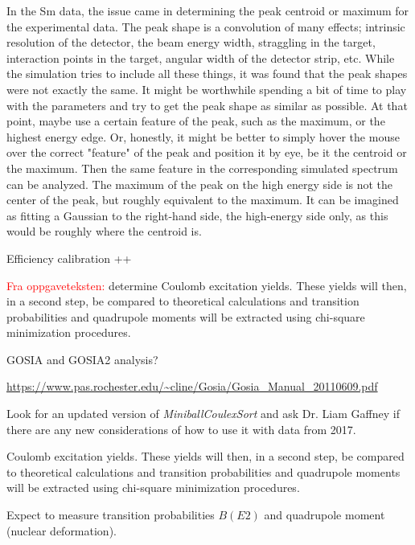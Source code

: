 \documentclass[twoside,english]{uiofysmaster/uiofysmaster}
\begin{document}
\bigskip


In the Sm data, the issue came in determining the peak centroid or maximum for the experimental data. 
The peak shape is a convolution of many effects; intrinsic resolution of the detector, the beam energy width, straggling in the target, interaction points in the target, angular width of the detector strip, etc. 
While the simulation tries to include all these things, it was found that the peak shapes were not exactly the same. 
It might be worthwhile spending a bit of time to play with the parameters and try to get the peak shape as similar as possible. 
At that point, maybe use a certain feature of the peak, such as the maximum, or the highest energy edge. 
Or, honestly, it might be better to simply hover the mouse over the correct "feature" of the peak and position it by eye, be it the centroid or the maximum.
Then the same feature in the corresponding simulated spectrum can be analyzed.
The maximum of the peak on the high energy side is not the center of the peak, but roughly equivalent to the maximum. 
It can be imagined as fitting a Gaussian to the right-hand side, the high-energy side only, as this would be roughly where the centroid is. 


\bigskip

Efficiency calibration ++

\bigskip

\textcolor{red}{Fra oppgaveteksten:} \newline
determine Coulomb excitation yields. These yields will then, in a second step, be compared to theoretical calculations and transition probabilities and quadrupole moments will be extracted using chi-square minimization procedures.


GOSIA and GOSIA2 analysis?

\url{https://www.pas.rochester.edu/~cline/Gosia/Gosia_Manual_20110609.pdf}

\bigskip

Look for an updated version of \textsl{MiniballCoulexSort} and ask Dr. Liam Gaffney if there are any new considerations of how to use it with data from 2017.

\bigskip

Coulomb excitation yields. These yields will then, in a second step, be compared to theoretical calculations and transition probabilities and quadrupole moments will be extracted using chi-square minimization procedures.

\bigskip

Expect to measure transition probabilities $B(E2)$ and quadrupole moment (nuclear deformation). 
\end{document}
